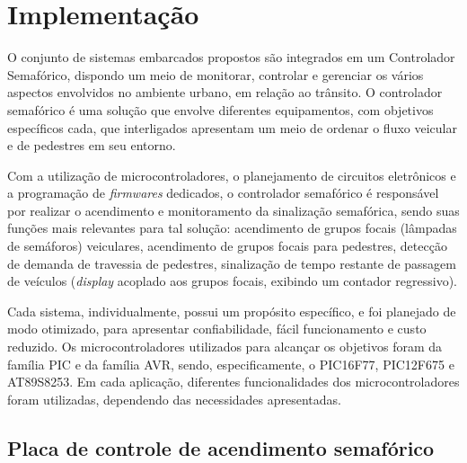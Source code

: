 \chapter{Implementação}

O conjunto de sistemas embarcados propostos são integrados em um Controlador Semafórico, dispondo um meio de monitorar, controlar e gerenciar os vários aspectos envolvidos no ambiente urbano, em relação ao trânsito. O controlador semafórico é uma solução que envolve diferentes equipamentos, com objetivos específicos cada, que interligados apresentam um meio de ordenar o fluxo veicular e de pedestres em seu entorno.

Com a utilização de microcontroladores, o planejamento de circuitos eletrônicos e a programação de \textit{firmwares} dedicados, o controlador semafórico é responsável por realizar o acendimento e monitoramento da sinalização semafórica, sendo suas funções mais relevantes para tal solução: acendimento de grupos focais (lâmpadas de semáforos) veiculares, acendimento de grupos focais para pedestres, detecção de demanda de travessia de pedestres, sinalização de tempo restante de passagem de veículos (\textit{display} acoplado aos grupos focais, exibindo um contador regressivo).

Cada sistema, individualmente, possui um propósito específico, e foi planejado de modo otimizado, para apresentar confiabilidade, fácil funcionamento e custo reduzido. Os microcontroladores utilizados para alcançar os objetivos foram da família PIC e da família AVR, sendo, especificamente, o PIC16F77, PIC12F675 e AT89S8253. Em cada aplicação, diferentes funcionalidades dos microcontroladores foram utilizadas, dependendo das necessidades apresentadas.


\section{Placa de controle de acendimento semafórico}

